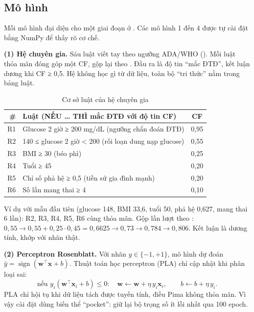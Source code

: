 \subsection{Mô hình}

Mỗi mô hình đại diện cho một giai đoạn ở . Các mô hình 1 đến 4 được tự cài đặt bằng NumPy để thấy rõ cơ chế.

\textbf{(1) Hệ chuyên gia.} Sáu luật viết tay theo ngưỡng ADA/WHO (). Mỗi luật thỏa mãn đóng góp một CF, gộp lại theo . Đầu ra là độ tin ``mắc ĐTĐ'', kết luận dương khi CF ≥ 0,5. Hệ không học gì từ dữ liệu, toàn bộ ``tri thức'' nằm trong bảng luật.

\begin{table}[H]
\centering
\caption{Cơ sở luật của hệ chuyên gia}
\label{tab:pima-rules}
\small
\begin{tabularx}{\linewidth}{@{}rYc@{}}
\toprule
\textbf{\#} & \textbf{Luật (NẾU … THÌ mắc ĐTĐ với độ tin CF)} & \textbf{CF} \\
\midrule
R1 & Glucose 2 giờ ≥ 200 mg/dL (ngưỡng chẩn đoán ĐTĐ) & 0,95 \\
R2 & 140 ≤ glucose 2 giờ < 200 (rối loạn dung nạp glucose) & 0,55 \\
R3 & BMI ≥ 30 (béo phì) & 0,25 \\
R4 & Tuổi ≥ 45 & 0,20 \\
R5 & Chỉ số phả hệ ≥ 0,5 (tiền sử gia đình mạnh) & 0,20 \\
R6 & Số lần mang thai ≥ 4 & 0,10 \\
\bottomrule
\end{tabularx}
\end{table}

Ví dụ với mẫu đầu tiên (glucose 148, BMI 33,6, tuổi 50, phả hệ 0,627, mang thai 6 lần): R2, R3, R4, R5, R6 cùng thỏa mãn. Gộp lần lượt theo : $0{,}55 \to 0{,}55 + 0{,}25 \cdot 0{,}45 = 0{,}6625 \to 0{,}73 \to 0{,}784 \to 0{,}806$. Kết luận là dương tính, khớp với nhãn thật.

\textbf{(2) Perceptron Rosenblatt.} Với nhãn $y\in\{-1,+1\}$, mô hình dự đoán $\hat y = \operatorname{sign}(\mathbf w^\top \mathbf x + b)$. Thuật toán học perceptron (PLA) chỉ cập nhật khi phân loại sai:
\begin{equation}
\text{nếu } y_i(\mathbf w^\top\mathbf x_i + b) \le 0: \quad \mathbf w \leftarrow \mathbf w + \eta\, y_i \mathbf x_i,\qquad b \leftarrow b + \eta\, y_i .
\label{eq:pla}
\end{equation}
PLA chỉ hội tụ khi dữ liệu tách được tuyến tính, điều Pima không thỏa mãn. Vì vậy cài đặt dùng biến thể ``pocket'': giữ lại bộ trọng số ít lỗi nhất qua 100 epoch.

